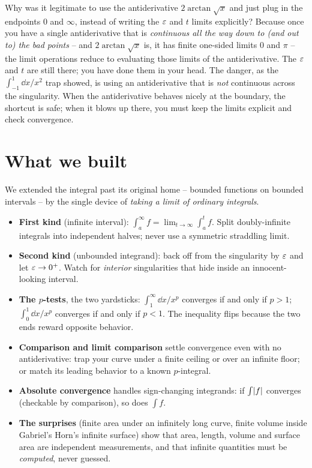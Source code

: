\begin{whybox}
Why was it legitimate to use the antiderivative $2\arctan\sqrt x$ and just plug in
the endpoints $0$ and $\infty$, instead of writing the $\varepsilon$ and $t$ limits
explicitly? Because once you have a single antiderivative that is \emph{continuous
all the way down to (and out to) the bad points} -- and $2\arctan\sqrt x$ is, it has
finite one-sided limits $0$ and $\pi$ -- the limit operations reduce to evaluating
those limits of the antiderivative. The $\varepsilon$ and $t$ are still there; you have
done them in your head. The danger, as the $\int_{-1}^1 \dd x/x^2$ trap showed,
is using an antiderivative that is \emph{not} continuous across the singularity.
When the antiderivative behaves nicely at the boundary, the shortcut is safe; when
it blows up there, you must keep the limits explicit and check convergence.
\end{whybox}

\section{What we built}
\label{ch25:summary}

We extended the integral past its original home -- bounded functions on bounded
intervals -- by the single device of \emph{taking a limit of ordinary integrals}.

\begin{itemize}
  \item \textbf{First kind} (infinite interval):
  $\int_a^\infty f = \lim_{t\to\infty}\int_a^t f$. Split doubly-infinite integrals
  into independent halves; never use a symmetric straddling limit.
  \item \textbf{Second kind} (unbounded integrand): back off from the singularity
  by $\varepsilon$ and let $\varepsilon\to 0^+$. Watch for \emph{interior} singularities that
  hide inside an innocent-looking interval.
  \item \textbf{The $p$-tests}, the two yardsticks: $\int_1^\infty \dd x/x^p$
  converges if and only if $p>1$; $\int_0^1 \dd x/x^p$ converges if and only if
$p<1$. The inequality
  flips because the two ends reward opposite behavior.
  \item \textbf{Comparison and limit comparison} settle convergence even with no
  antiderivative: trap your curve under a finite ceiling or over an infinite floor;
  or match its leading behavior to a known $p$-integral.
  \item \textbf{Absolute convergence} handles sign-changing integrands: if
  $\int\lvert f\rvert$ converges (checkable by comparison), so does $\int f$.
  \item \textbf{The surprises} (finite area under an infinitely long curve, finite
  volume inside Gabriel's Horn's infinite surface) show that area, length, volume
  and surface area are independent measurements, and that infinite quantities must
  be \emph{computed}, never guessed.
\end{itemize}

